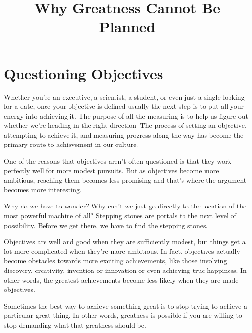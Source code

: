 \documentclass[ebook,12pt,oneside,openany]{memoir}
\begin{document}
\title{Why Greatness Cannot Be Planned}
\maketitle

\section{Questioning Objectives}
Whether you're an executive, a scientist, a student, or even just a single looking for a date, once your objective is defined usually the next step is to put all your energy into achieving it. 
The purpose of all the measuring is to help us figure out whether we're heading in the right direction.
The process of setting an objective, attempting to achieve it, and measuring progress along the way has become the primary route to achievement in our culture.

One of the reasons that objectives aren't often questioned is that they work perfectly well for more modest pursuits. But as objectives become more ambitious, reaching them becomes less promising-and that's where the argument becomes more interesting.

Why do we have to wander? Why can't we just go directly to the location of the most powerful machine of all? 
Stepping stones are portals to the next level of possibility. Before we get there, we have to find the stepping stones.

Objectives are well and good when they are sufficiently modest, but things get a lot more complicated when they're more ambitious.
In fact, objectives actually become obstacles towards more exciting achievements, like those involving discovery, creativity, invention or innovation-or even achieving true happiness.
In other words, the greatest achievements become less likely when they are made objectives.

Sometimes the best way to achieve something great is to stop trying to achieve a particular great thing.
In other words, greatness is possible if you are willing to stop demanding what that greatness should be.
\end{document}
